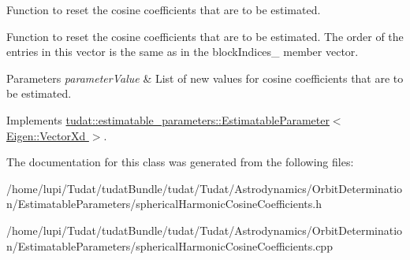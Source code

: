 Function to reset the cosine coefficients that are to be estimated. 

Function to reset the cosine coefficients that are to be estimated. The order of the entries in this vector is the same as in the block\+Indices\+\_\+ member vector. 
\begin{DoxyParams}{Parameters}
{\em parameter\+Value} & List of new values for cosine coefficients that are to be estimated. \\
\hline
\end{DoxyParams}


Implements \hyperlink{classtudat_1_1estimatable__parameters_1_1EstimatableParameter_a5df35bde257a6db401ca3c3613056554}{tudat\+::estimatable\+\_\+parameters\+::\+Estimatable\+Parameter$<$ Eigen\+::\+Vector\+Xd $>$}.



The documentation for this class was generated from the following files\+:\begin{DoxyCompactItemize}
\item 
/home/lupi/\+Tudat/tudat\+Bundle/tudat/\+Tudat/\+Astrodynamics/\+Orbit\+Determination/\+Estimatable\+Parameters/spherical\+Harmonic\+Cosine\+Coefficients.\+h\item 
/home/lupi/\+Tudat/tudat\+Bundle/tudat/\+Tudat/\+Astrodynamics/\+Orbit\+Determination/\+Estimatable\+Parameters/spherical\+Harmonic\+Cosine\+Coefficients.\+cpp\end{DoxyCompactItemize}
